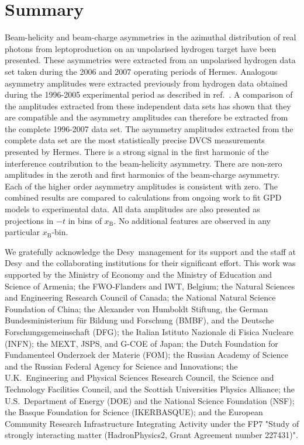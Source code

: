\documentclass[11pt,a4paper]{article}
\def\desy{{\sc Desy}}
\begin{document}
\section{Summary}
Beam-helicity and beam-charge asymmetries in the azimuthal distribution of real photons from leptoproduction on an unpolarised hydrogen target have been presented. These asymmetries were extracted from an unpolarised hydrogen data set taken during the 2006 and 2007 operating periods of H{\sc ermes}. Analogous asymmetry amplitudes were extracted previously from hydrogen data obtained during the 1996-2005 experimental period as described in ref.~\cite{Air09}. A comparison of the amplitudes extracted from these independent data sets has shown that they are compatible and the asymmetry amplitudes can therefore be extracted from the complete 1996-2007 data set. The asymmetry amplitudes extracted from the complete data set are the most statistically precise DVCS measurements presented by H{\sc ermes}. There is a strong signal in the first harmonic of the interference contribution to the beam-helicity asymmetry. There are non-zero amplitudes in the zeroth and first harmonics of the beam-charge asymmetry. Each of the higher order asymmetry amplitudes is consistent with zero. The combined results are compared to calculations from ongoing work to fit GPD models to experimental data. All data amplitudes are also presented as projections in $-t$ in bins of $x_{\textrm{B}}$. No additional features are observed in any particular $x_{\textrm{B}}$-bin.

\acknowledgments
We gratefully acknowledge the \desy\ management for its support and the staff
at \desy\ and the collaborating institutions for their significant effort.
This work was supported by 
the Ministry of Economy and the Ministry of Education and Science of Armenia;
the FWO-Flanders and IWT, Belgium;
the Natural Sciences and Engineering Research Council of Canada;
the National Natural Science Foundation of China;
the Alexander von Humboldt Stiftung,
the German Bundesministerium f\"ur Bildung und Forschung (BMBF), and
the Deutsche Forschungsgemeinschaft (DFG);
the Italian Istituto Nazionale di Fisica Nucleare (INFN);
the MEXT, JSPS, and G-COE of Japan;
the Dutch Foundation for Fundamenteel Onderzoek der Materie (FOM);
the Russian Academy of Science and the Russian Federal Agency for 
Science and Innovations;
the U.K.~Engineering and Physical Sciences Research Council, 
the Science and Technology Facilities Council,
and the Scottish Universities Physics Alliance;
the U.S.~Department of Energy (DOE) and the National Science Foundation (NSF);
the Basque Foundation for Science (IKERBASQUE);
and the European Community Research Infrastructure Integrating Activity
under the FP7 "Study of strongly interacting matter (HadronPhysics2, Grant
Agreement number 227431)".
\end{document}
